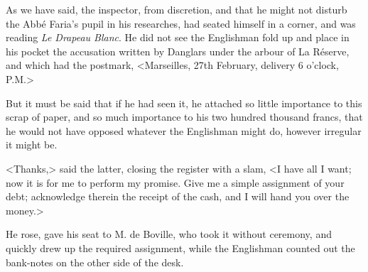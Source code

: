  As we have said, the inspector, from discretion, and that he might not disturb the Abbé Faria's pupil in his researches, had seated himself in a corner, and was reading \textit{Le Drapeau Blanc}. He did not see the Englishman fold up and place in his pocket the accusation written by Danglars under the arbour of La Réserve, and which had the postmark, <Marseilles, 27th February, delivery 6 o'clock, P.M.> 

 But it must be said that if he had seen it, he attached so little importance to this scrap of paper, and so much importance to his two hundred thousand francs, that he would not have opposed whatever the Englishman might do, however irregular it might be. 

 <Thanks,> said the latter, closing the register with a slam, <I have all I want; now it is for me to perform my promise. Give me a simple assignment of your debt; acknowledge therein the receipt of the cash, and I will hand you over the money.> 

 He rose, gave his seat to M. de Boville, who took it without ceremony, and quickly drew up the required assignment, while the Englishman counted out the bank-notes on the other side of the desk. 